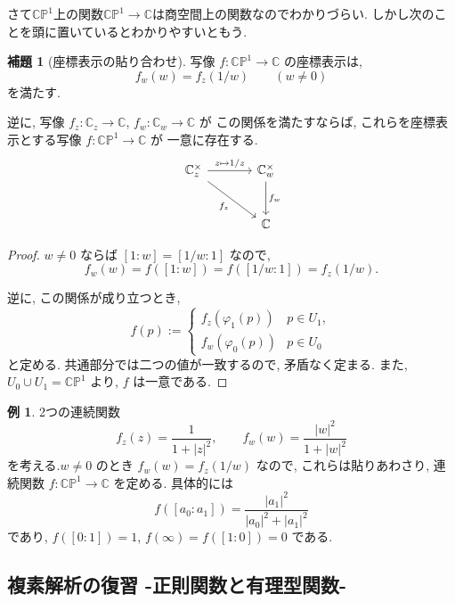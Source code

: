 \documentclass[dvipdfmx,a4paper,11pt]{article} %
\newcommand{\C}{\mathbb{C}}
\theoremstyle{definition}
\numberwithin{equation}{section}
\newtheorem{lem}[thm]{補題}
\newtheorem{exa}[thm]{例}
\begin{document}
さて$\C\mathbb P^1$上の関数$\C\mathbb P^1\to \C$は商空間上の関数なのでわかりづらい. 
しかし次のことを頭に置いているとわかりやすいともう. 

\begin{lem}[座標表示の貼り合わせ]
写像 $f:\C\mathbb P^1\to\C$ の座標表示は,
\[
f_w(w)=f_z(1/w)\qquad(w\neq0)
\]
を満たす.

逆に, 写像 $f_z:\C_z\to\C$, $f_w:\C_w\to\C$ が
この関係を満たすならば,
これらを座標表示とする写像 $f:\C\mathbb P^1\to\C$ が
一意に存在する.
\[
\begin{tikzcd}[column sep=large,row sep=large]
\C_z^\times
\arrow[r,"z\mapsto1/z"]
\arrow[dr,"f_z"']
&
\C_w^\times
\arrow[d,"f_w"]
\\
&\C
\end{tikzcd}
\]
\end{lem}

\begin{proof}
$w\neq0$ ならば $[1:w]=[1/w:1]$ なので,
\[
f_w(w)=f([1:w])=f([1/w:1])=f_z(1/w).
\]

逆に, この関係が成り立つとき,
\[
f(p):=
\begin{cases}
f_z(\varphi_1(p)) & p\in U_1,\\
f_w(\varphi_0(p)) & p\in U_0
\end{cases}
\]
と定める.
共通部分では二つの値が一致するので, 矛盾なく定まる.
また, $U_0\cup U_1=\C\mathbb P^1$ より, $f$ は一意である.
\end{proof}

\begin{exa}
2つの連続関数
\[
f_z(z)=\frac{1}{1+|z|^2},\qquad
f_w(w)=\frac{|w|^2}{1+|w|^2}
\]
を考える.$w\neq 0$ のとき $f_w(w)=f_z(1/w)$ なので, 
これらは貼りあわさり, 連続関数 $f:\C\mathbb P^1\to\C$ を定める.
具体的には
\[
f([a_0:a_1])=\frac{|a_1|^2}{|a_0|^2+|a_1|^2}
\]
であり, $f([0:1])=1$, $f(\infty)=f([1:0])=0$ である.
\end{exa}


\subsection{複素解析の復習 -正則関数と有理型関数-}\label{O-S011-plane}
\end{document}
